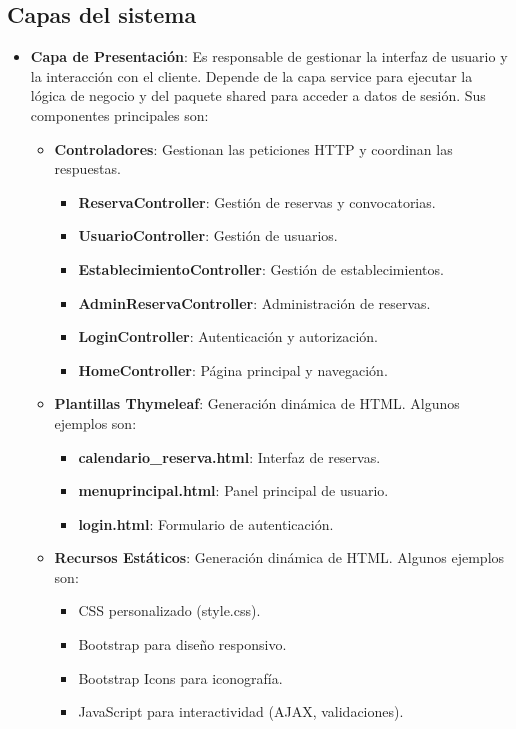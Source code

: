 \subsection{Capas del sistema}
\begin{itemize}
	\item \textbf{Capa de Presentación}: Es responsable de gestionar la interfaz de usuario y la interacción con el cliente. Depende de la capa service para ejecutar la lógica de negocio y del paquete shared para acceder a datos de sesión. Sus componentes principales son:
    	\begin{itemize}
            \item \textbf{Controladores}: Gestionan las peticiones HTTP y coordinan las respuestas. 
        	\begin{itemize}
                \item \textbf{ReservaController}: Gestión de reservas y convocatorias.
                \item \textbf{UsuarioController}: Gestión de usuarios.
                \item \textbf{EstablecimientoController}: Gestión de establecimientos.
                \item \textbf{AdminReservaController}: Administración de reservas.
                \item \textbf{LoginController}: Autenticación y autorización.
                \item \textbf{HomeController}: Página principal y navegación.
             \end{itemize}

            \item \textbf{Plantillas Thymeleaf}: Generación dinámica de HTML. Algunos ejemplos son:
            \begin{itemize}
               \item \textbf{calendario\_reserva.html}: Interfaz de reservas.
               \item \textbf{menuprincipal.html}: Panel principal de usuario.
               \item \textbf{login.html}: Formulario de autenticación.
            \end{itemize}

            \item \textbf{Recursos Estáticos}: Generación dinámica de HTML. Algunos ejemplos son:
            \begin{itemize}
               \item CSS personalizado (style.css).
               \item Bootstrap para diseño responsivo.
               \item Bootstrap Icons para iconografía.
               \item JavaScript para interactividad (AJAX, validaciones).
            \end{itemize}


\end{itemize}
\end{itemize}
